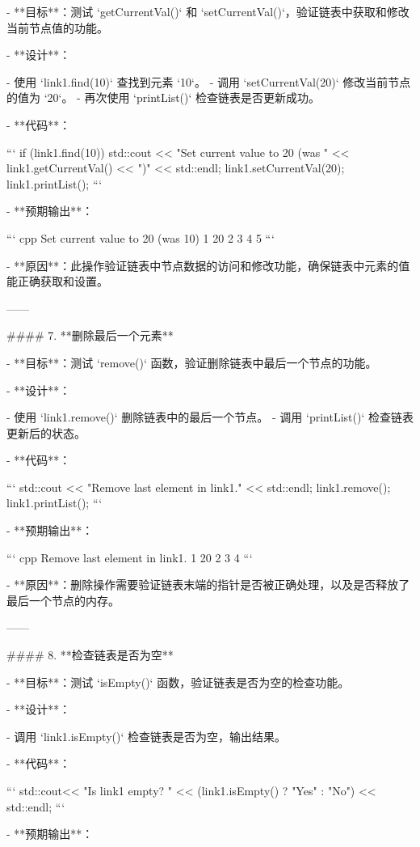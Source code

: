 - **目标**：测试 `getCurrentVal()` 和 `setCurrentVal()`，验证链表中获取和修改当前节点值的功能。

- **设计**：

  - 使用 `link1.find(10)` 查找到元素 `10`。
  - 调用 `setCurrentVal(20)` 修改当前节点的值为 `20`。
  - 再次使用 `printList()` 检查链表是否更新成功。

- **代码**：

  ```
  if (link1.find(10)) {
      std::cout << "Set current value to 20 (was " << link1.getCurrentVal() << ")" << std::endl;
      link1.setCurrentVal(20);
      link1.printList();
  }
  ```

- **预期输出**：

  ``` cpp
  Set current value to 20 (was 10)
  1  20  2  3  4  5
  ```

  

- **原因**：此操作验证链表中节点数据的访问和修改功能，确保链表中元素的值能正确获取和设置。

------

#### 7. **删除最后一个元素**

- **目标**：测试 `remove()` 函数，验证删除链表中最后一个节点的功能。

- **设计**：

  - 使用 `link1.remove()` 删除链表中的最后一个节点。
  - 调用 `printList()` 检查链表更新后的状态。

- **代码**：

  ```
  std::cout << "Remove last element in link1." << std::endl;
  link1.remove();
  link1.printList();
  ```

- **预期输出**：

  ``` cpp
  Remove last element in link1.
  1  20  2  3  4
  ```

  

- **原因**：删除操作需要验证链表末端的指针是否被正确处理，以及是否释放了最后一个节点的内存。

------

#### 8. **检查链表是否为空**

- **目标**：测试 `isEmpty()` 函数，验证链表是否为空的检查功能。

- **设计**：

  - 调用 `link1.isEmpty()` 检查链表是否为空，输出结果。

- **代码**：

  ```
  std::cout<< "Is link1 empty? " << (link1.isEmpty() ? "Yes" : "No") << std::endl;
  ```

- **预期输出**：


